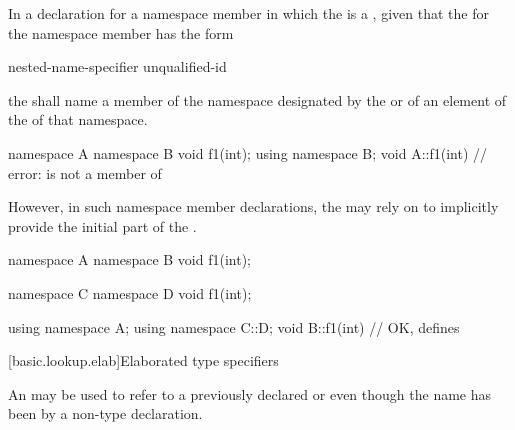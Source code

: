 \pnum
In a declaration for a namespace member in which the
 is a , given that the
 for the namespace member has the form
\begin{ncbnf}
nested-name-specifier unqualified-id
\end{ncbnf}
the
 shall name a member of the namespace
designated by the 
or of an element of the  of that namespace.
\begin{example}
\begin{codeblock}
namespace A {
  namespace B {
    void f1(int);
  }
  using namespace B;
}
void A::f1(int){ }  // error:  is not a member of 
\end{codeblock}
\end{example}
However, in such namespace member declarations, the
 may rely on 
to implicitly provide the initial part of the
.
\begin{example}
\begin{codeblock}
namespace A {
  namespace B {
    void f1(int);
  }
}

namespace C {
  namespace D {
    void f1(int);
  }
}

using namespace A;
using namespace C::D;
void B::f1(int){ }  // OK, defines 
\end{codeblock}
\end{example}
%

[basic.lookup.elab]{Elaborated type specifiers}%
%

\pnum
An  may be
used to refer to a previously declared  or
 even though the name has been
 by a non-type
declaration.

